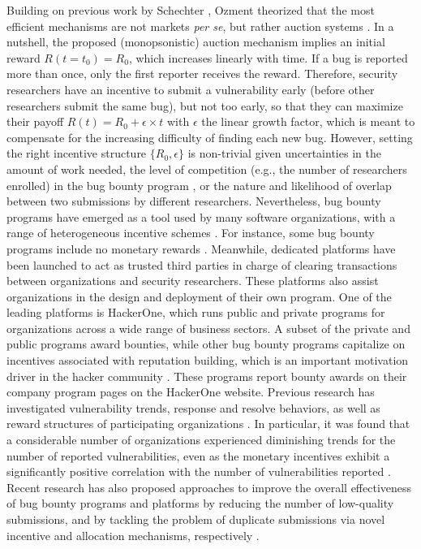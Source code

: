 Building on previous work by Schechter \cite{schechter2002buy}, Ozment \cite{ozment2004bug} theorized that the most efficient mechanisms are not markets {\it per se}, but rather auction systems \cite{milgrom1982theory}. In a nutshell, the proposed (monopsonistic) auction mechanism implies an initial reward $R(t=t_0) = R_0$, which increases linearly with time. If a bug is reported more than once, only the first reporter receives the reward. Therefore, security researchers have an incentive to submit a vulnerability early (before other researchers submit the same bug), but not too early, so that they can maximize their payoff $R(t) = R_0 + \epsilon \times t$ with $\epsilon$ the linear growth factor, which is meant to compensate for the increasing difficulty of finding each new bug. However, setting the right incentive structure $\{R_0,\epsilon \}$ is non-trivial given uncertainties in the amount of work needed, the level of competition (e.g., the number of researchers enrolled) in the bug bounty program \cite{pandey2014assessment}, or the nature and likelihood of overlap between two submissions by different researchers. Nevertheless, bug bounty programs have emerged as a tool used by many software organizations, with a range of heterogeneous incentive schemes \cite{finifter2013empirical}. For instance, some bug bounty programs include no monetary rewards \cite{zhao2014exploratory}. Meanwhile, dedicated platforms have been launched to act as trusted third parties in charge of clearing transactions between organizations and security researchers. These platforms also assist organizations in the design and deployment of their own program. One of the leading platforms is HackerOne, which runs public and private programs for organizations across a wide range of business sectors. A subset of the private and public programs award bounties, while other bug bounty programs capitalize on incentives associated with reputation building, which is an important motivation driver in the hacker community \cite{lakhani2005htu}. These programs report bounty awards on their company program pages on the HackerOne website. Previous research has investigated vulnerability trends, response and resolve behaviors, as well as reward structures of participating organizations \cite{zhao2014exploratory,zhao2015empirical}. In particular, it was found that a considerable number of organizations experienced diminishing trends for the number of reported vulnerabilities, even as the monetary incentives exhibit a significantly positive correlation with the number of vulnerabilities reported \cite{zhao2015empirical}. Recent research has also proposed approaches to improve the overall effectiveness of bug bounty programs and platforms by reducing the number of low-quality submissions, and by tackling the problem of duplicate submissions via novel incentive and allocation mechanisms, respectively \cite{laszka2016banishing, zhao2016crowdsourced, zhao2017devising}.

